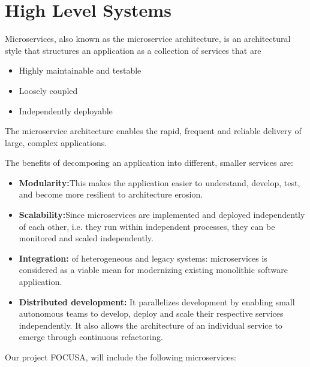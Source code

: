 \section{High Level Systems}
Microservices, also known as the microservice architecture, is an architectural style that structures an 
application as a collection of services that are
\begin{itemize}
    \item Highly maintainable and testable
    \item Loosely coupled
    \item Independently deployable
\end{itemize}

The microservice architecture enables the rapid, frequent and reliable delivery of large, complex applications.

The benefits of decomposing an application into different, smaller services are:

\begin{itemize}
    \item \textbf{Modularity:}This makes the application easier to understand, develop, test, and 
    become more resilient to architecture erosion.
    \item \textbf{Scalability:}Since microservices are implemented and deployed independently of 
    each other, i.e. they run within independent processes, they can be monitored and scaled independently.
    \item \textbf{Integration:} of heterogeneous and legacy systems: microservices is considered as a 
    viable mean for modernizing existing monolithic software application.
    \item \textbf{Distributed development:} It parallelizes development by enabling small autonomous teams to
    develop, deploy and scale their respective services independently. It also allows the architecture of 
    an individual service to emerge through continuous refactoring.
\end{itemize}

Our project FOCUSA, will include the following microservices:

